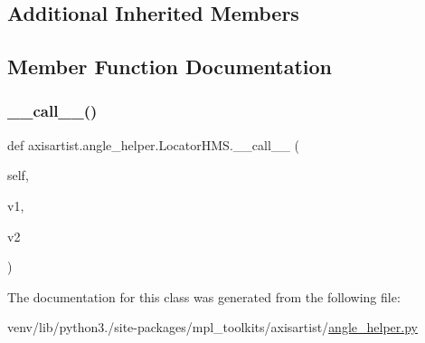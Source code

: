 \subsection*{Additional Inherited Members}


\subsection{Member Function Documentation}
\mbox{\label{classaxisartist_1_1angle__helper_1_1LocatorHMS_aed44bd54a0e3c599c2ea1138ed634e68}} 
\subsubsection{\texorpdfstring{\+\_\+\+\_\+call\+\_\+\+\_\+()}{\_\_call\_\_()}}
{\footnotesize\ttfamily def axisartist.\+angle\+\_\+helper.\+Locator\+H\+M\+S.\+\_\+\+\_\+call\+\_\+\+\_\+ (\begin{DoxyParamCaption}\item[{}]{self,  }\item[{}]{v1,  }\item[{}]{v2 }\end{DoxyParamCaption})}



The documentation for this class was generated from the following file\+:\begin{DoxyCompactItemize}
\item 
venv/lib/python3./site-\/packages/mpl\+\_\+toolkits/axisartist/\hyperlink{axisartist_2angle__helper_8py}{angle\+\_\+helper.\+py}\end{DoxyCompactItemize}
